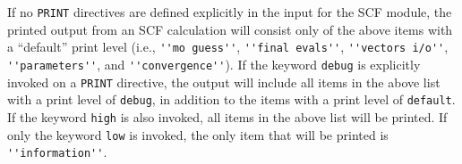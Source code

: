If no \verb+PRINT+ directives are defined explicitly in the input for the
SCF module, the printed output from an SCF calculation will consist only
of the above items with a ``default'' print level (i.e., \verb+''mo guess''+,
\verb+''final evals''+, \verb+''vectors i/o''+, \verb+''parameters''+,
and \verb+''convergence''+).  If the keyword \verb+debug+ is explicitly
invoked on a \verb+PRINT+ directive, the output will include all items
in the above list with a print level of \verb+debug+, in addition to the
items with a print level of \verb+default+.  If the keyword \verb+high+ is
also invoked, all items in the above list will be printed.  If only the
keyword \verb+low+ is invoked, the only item that will be printed is
\verb+''information''+.




